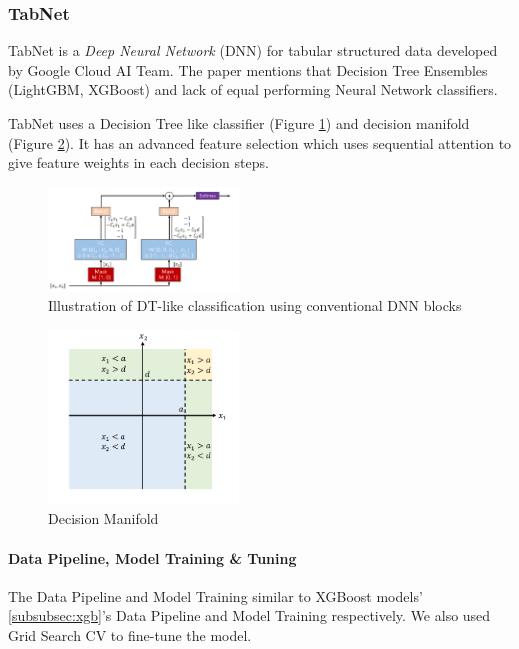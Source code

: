 \documentclass[sigconf, nonacm]{acmart}
\begin{document}
\subsubsection{TabNet} \label{subsubsec:tabnet}

TabNet\cite{arik2020tabnet} is a \emph{Deep Neural Network} (DNN) for tabular structured data developed by Google Cloud AI Team. The paper\cite{arik2020tabnet} mentions that Decision Tree Ensembles (LightGBM\cite{Ke2017LightGBMAH}, XGBoost\cite{Chen_2016}) and lack of equal performing Neural Network classifiers.

TabNet uses a Decision Tree like classifier (Figure \ref{fig:dt_like_class}) and decision manifold (Figure \ref{fig:dec_man}). It has an advanced feature selection which uses sequential attention to give feature weights in each decision steps.

\begin{figure}[h]
	\centering
	\includegraphics[width=0.45\textwidth]{tabnet/1908.07442-1.png}
	\caption{Illustration of DT-like classification using conventional DNN blocks}
	\label{fig:dt_like_class}
\end{figure}

\begin{figure}[h]
	\centering
	\includegraphics[width=0.45\textwidth]{tabnet/1908.07442-2.png}
	\caption{Decision Manifold}
	\label{fig:dec_man}
\end{figure}

\paragraph{Data Pipeline, Model Training \& Tuning}
The Data Pipeline and Model Training similar to XGBoost models' \ref{subsubsec:xgb}'s Data Pipeline and Model Training respectively. We also used Grid Search CV to fine-tune the model.
\end{document}
